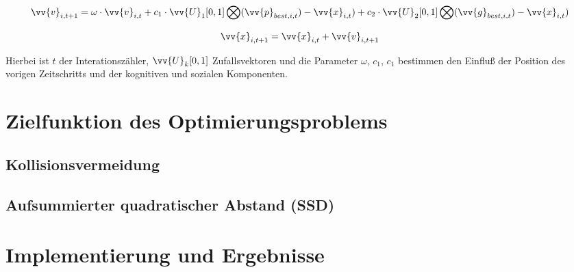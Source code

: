 \begin{equation}
\vv{v}_{i,t+1} = \omega\cdot\vv{v}_{i,t}+c_{1}\cdot\vv{U}_{1}[0,1]\bigotimes(\vv{p}_{best,i,t})-\vv{x}_{i,t})
+c_{2}\cdot\vv{U}_{2}[0,1]\bigotimes(\vv{g}_{best,i,t})-\vv{x}_{i,t})
\end{equation}

\begin{equation}
\vv{x}_{i,t+1} = \vv{x}_{i,t} + \vv{v}_{i,t+1}
\end{equation}

Hierbei ist $t$ der Interationsz\"ahler, $\vv{U}_{k}[0,1]$ Zufallsvektoren und die Parameter $\omega$, $c_{1}$, $c_{1}$ bestimmen den Einflu{\ss}  der Position des vorigen Zeitschritts und der kognitiven und sozialen Komponenten.

\section{Zielfunktion des Optimierungsproblems}



\subsection{Kollisionsvermeidung}

\subsection{Aufsummierter quadratischer Abstand (SSD)}

\section{Implementierung und Ergebnisse}

